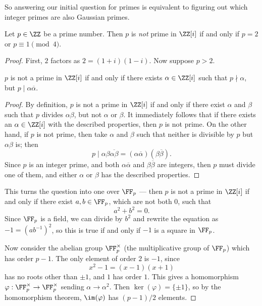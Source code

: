So answering our initial question for primes is equivalent to figuring out which integer primes are also Gaussian primes. 

\begin{lemma}
Let $p \in \ZZ$ be a prime number. Then $p$ is \emph{not} prime in $\ZZ[i]$ if and only if $p = 2$ or $p \equiv 1 \pmod{4}$. 
\end{lemma}

\begin{proof}
First, $2$ factors as $2 = (1 + i)(1 - i)$. Now suppose $p > 2$. 

\begin{claim*}
$p$ is not a prime in $\ZZ[i]$ if and only if there exists $\alpha \in \ZZ[i]$ such that $p \nmid \alpha$, but $p \mid \alpha\overline{\alpha}$.
\end{claim*}

\begin{proof}
    By definition, $p$ is not a prime in $\ZZ[i]$ if and only if there exist $\alpha$ and $\beta$ such that $p$ divides $\alpha\beta$, but not $\alpha$ or $\beta$. It immediately follows that if there exists an $\alpha \in \ZZ[i]$ with the described properties, then $p$ is not prime. On the other hand, if $p$ is not prime, then take $\alpha$ and $\beta$ such that neither is divisible by $p$ but $\alpha\beta$ is; then \[p \mid \alpha\beta\overline{\alpha\beta} = (\alpha\overline{\alpha})(\beta\overline{\beta}).\] Since $p$ is an integer prime, and both $\alpha\overline{\alpha}$ and $\beta\overline{\beta}$ are integers, then $p$ must divide one of them, and either $\alpha$ or $\beta$ has the described properties. 
\end{proof}

This turns the question into one over $\FF_p$ --- then $p$ is not a prime in $\ZZ[i]$ if and only if there exist $a, b \in \FF_p$, which are not both $0$, such that \[a^2 + b^2 = 0.\] Since $\FF_p$ is a field, we can divide by $b^2$ and rewrite the equation as $-1 = (ab^{-1})^2$, so this is true if and only if $-1$ is a square in $\FF_p$.

Now consider the abelian group $\FF_p^\times$ (the multiplicative group of $\FF_p$) which has order $p - 1$. The only element of order $2$ is $-1$, since \[x^2 - 1 = (x - 1)(x + 1)\] has no roots other than $\pm 1$, and $1$ has order $1$. This gives a homomorphism $\varphi : \FF_p^\times \to \FF_p^\times$ sending $\alpha \to \alpha^2$. Then $\ker(\varphi) = \{\pm 1\}$, so by the homomorphism theorem, $\im(\varphi)$ has $(p - 1)/2$ elements. 


\end{proof}
